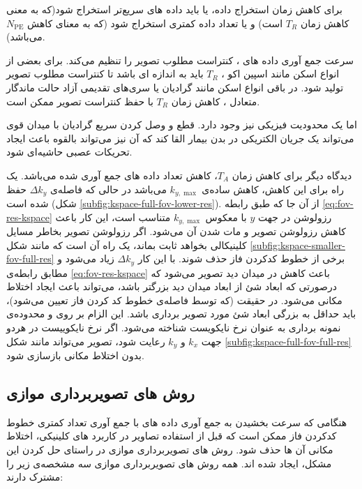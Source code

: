 برای کاهش زمان استخراج داده، یا باید داده های \kspace سریع‌تر استخراج شود(که به معنی کاهش زمان $T_R$
است) و یا تعداد داده کمتری استخراج شود (که به معنای کاهش $N_\mathrm{PE}$ می‌باشد).


سرعت جمع آوری داده های \kspace، کنتراست مطلوب تصویر را تنظیم می‌کند. برای بعضی از انواع اسکن مانند اسپین اکو
، $T_R$ باید به اندازه ای باشد تا کنتراست مطلوب تصویر تولید شود. در باقی انواع اسکن مانند 
گرادیان
یا سری‌های تقدیمی آزاد حالت ماندگار متعادل
، کاهش زمان $T_R$ با حفظ کنتراست تصویر ممکن است.

اما یک محدودیت فیزیکی نیز وجود دارد. قطع و وصل کردن سریع گرادیان با میدان قوی می‌تواند یک جریان الکتریکی در بدن بیمار القا کند که آن نیز می‌تواند بالقوه باعث ایجاد تحریکات عصبی حاشیه‌ای
 شود\cite{ParallelMRImaging2012}.

دیدگاه دیگر برای کاهش زمان $T_A$، کاهش تعداد داده های جمع آوری شده می‌باشد. یک راه برای این کاهش، کاهش ساده‌ی $k_{y, \max}$
می‌باشد در حالی که فاصله‌ی $\Delta k_y$ حفظ شده است (شکل \ref{subfig:kspace-full-fov-lower-res}).
از آن جا که طبق رابطه \ref{eq:fov-res-kspace}
رزولوشن در جهت $y$ با معکوس $k_{y,\max}$ متناسب است، این کار باعث کاهش رزولوشن تصویر و مات شدن آن می‌شود.
اگر رزولوشن تصویر بخاطر مسایل کلینیکالی بخواهد ثابت بماند، یک راه آن است که مانند شکل \ref{subfig:kspace-smaller-fov-full-res} برخی از خطوط کدکردن فاز حذف شوند. با این کار $\Delta k_y$ زیاد می‌شود و مطابق رابطه‌ی \ref{eq:fov-res-kspace} باعث کاهش در میدان دید تصویر می‌شود که درصورتی که ابعاد شئ از ابعاد میدان دید بزرگتر باشد، می‌تواند باعث ایجاد اختلاط مکانی
می‌شود. در حقیقت  (که توسط فاصله‌ی خطوط کد کردن فاز تعیین می‌شود)، باید حداقل به بزرگی ابعاد شئ مورد تصویر برداری باشد. این الزام بر روی  و محدوده‌ی نمونه برداری \kspace به عنوان نرخ نایکویست
شناخته می‌شود. اگر نرخ نایکوییست در هردو جهت $k_x$ و  $k_y$ رعایت شود، تصویر می‌تواند مانند شکل \ref{subfig:kspace-full-fov-full-res}
بدون اختلاط مکانی بازسازی شود\cite{ParallelMRImaging2012}.



\subsection{روش های تصویربرداری موازی}

هنگامی که سرعت بخشیدن به جمع آوری داده های \mri با جمع آوری تعداد کمتری خطوط کدکردن فاز ممکن است که قبل از استفاده تصاویر در کاربرد های کلینیکی، اختلاط مکانی آن ها حذف شود. روش های تصویربرداری موازی در راستای حل کردن این مشکل، ایجاد شده اند. همه روش های تصویربرداری موازی سه مشخصه‌ی زیر را مشترک دارند\cite{ParallelMRImaging2012}:


